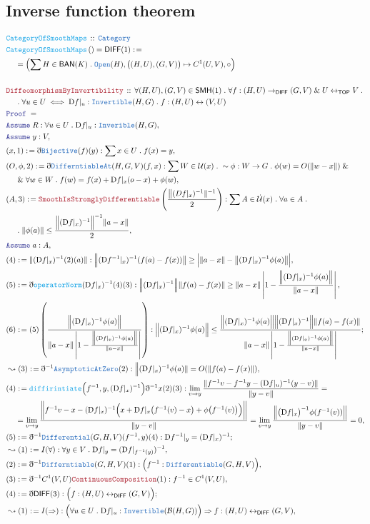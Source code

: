 \documentclass[12pt]{scrartcl}
\newcommand{\TYPE}[1]{\textcolor{NavyBlue}{\mathtt{#1}}}
\newcommand{\FUNC}[1]{\textcolor{Cerulean}{\mathtt{#1}}}
\newcommand{\LOGIC}[1]{\textcolor{Blue}{\mathtt{#1}}}
\newcommand{\THM}[1]{\textcolor{Maroon}{\mathtt{#1}}}
\renewcommand{\.}{\; . \;}
\newcommand{\de}{: \kern 0.1pc =}
\newcommand{\Act}[1]{\left( #1 \right)}
\newcommand{\Theorem}[2]{& \THM{#1} \, :: \, #2 \\ & \Proof = \\ }
\newcommand{\DeclareFunc}[2]{& \FUNC{#1} \, :: \, #2 \\}
\newcommand{\DefineNamedFunc}[4]{&  \FUNC{#1}\Act{#2} = #3 \de #4 \\}
\newcommand{\NewLine}{\\ & \kern 1pc}
\newcommand{\Page}[1]{\begin{align*} #1 \end{align*}   }
\newcommand{ \bd }{ \ByDef }
\renewcommand{\And}{\; \& \;}
\newcommand{\Cate}{\TYPE{Category}}
\newcommand{\ToBij}{\leftrightarrow}
\newcommand{\Say}[3]{& #1 \de #2 : #3, \\}
\newcommand{\Conclude}[3]{& #1 \de #2 : #3; \\}
\newcommand{\Derive}[3]{& \leadsto #1 \de #2 : #3, \\}
\newcommand{\A}{\LOGIC{Assume} \;}
\newcommand{\Assume}[2]{& \A #1 : #2, \\}
\newcommand{\ByDef}{\eth}
\newcommand{\Proof}{\LOGIC{Proof} \; }
\newcommand{\TOP}{\mathsf{TOP}}
\newcommand{\DIFF}{\mathsf{DIFF}}
\newcommand{\BAN}{\mathsf{BAN}} %
\newcommand{\D}{\mathrm{D}}
\newcommand{\B}{\mathcal{B}}
\begin{document}
\subsection{Inverse function theorem}
 \Page{
 	\DeclareFunc{CategoryOfSmoothMaps}{\Cate}
	\DefineNamedFunc{CategoryOfSmoothMaps}{}{\mathsf{DIFF}(1)}
	{
	\NewLine 
	  = \left( \sum H  \in \BAN(K) \. \TYPE{Open}(H) , \big( (H,U),(G,V) \big) \mapsto C^1(U,V) , \circ   \right)	
	}
	\\
\Theorem{DiffeomorphismByInvertibility}{\forall (H,U),(G,V) \in \mathsf{SMH}(1) \. \forall f : (H,U) \to_\DIFF (G,V) \And  U \ToBij_\TOP V \. \NewLine \.
  \forall u \in U  \iff \D f |_u : \TYPE{Invertible}(H,G) \. f : (H,U) \ToBij (V,U)
}
\Assume{R}{\forall u \in U \. \D f |_u : \TYPE{Inverible}(H,G)}
\Assume{y}{V}
\Say{(x,1)}{\bd \TYPE{Bijective}(f)(y)}{ \sum x \in U \. f(x) = y  }
\Say{(O,\phi,2)}{\bd \TYPE{DifferntiableAt}(H,G,V)(f,x)}{\sum W \in \mathcal{U}(x) \. \sim \phi : W \to G \.\phi(w) = O(\|w - x \|) 
 	\And 
	\NewLine \And
	\forall w \in W \. f(w) = f(x) + \D f |_x(o - x) + \phi(w) }
\Say{(A,3)}{ \THM{SmoothIsStronglyDifferentiable}\left(\frac{\big\|(D f|_x)^{-1}\|^{-1}}{2}\right)}
{\sum A \in \dot{\mathcal{U}}(x) \. \forall a \in A \. 
\NewLine \.
\|\phi(a)\|  \le \frac{\Big\|(\D f |_x )^{-1}\Big\|^{-1}\|a - x \|}{2}
}
\Assume{a}{A}
\Say{(4)}{ \|(\D f|_x)^{-1}(2)(a)\| }{  \Big \| (\D f^{-1} |_x)^{-1}(f(a) - f(x)) \big \| \ge \Big| \| a - x\|  - \big\| (\D f |_x)^{-1}\phi(a) \big\| \Big|   }
\Say{(5)}{ \bd \FUNC{operatorNorm}(\D f|_x)^{-1} (4)(3)}{\Big\| (\D f |_x)^{-1} \Big\| \| f(a) - f(x) \| \ge \|a - x\|\left|1 
	- \frac{\Big\|(\D f|_x)^{-1}\phi(a) \Big\|}{\|a - x\|} \right|  }
\Conclude{(6)}{ (5)\left(  \frac{\Big\| (\D f |_x)^{-1} \phi(a) \Big\|}{\|a - x\| 
\left| 1 - \frac{\Big\|(\D f |_x)^{-1} \phi(a)  \Big\|}{\|a - x\|}  \right|  }  \right)}
{  \Big\| (\D f |_x)^{-1}\phi(a) \Big\|   \le   \frac{\Big\| (\D f |_x)^{-1} \phi(a) \Big\|\Big\| (\D f |_x)^{-1}\Big\|\| f(a) - f(x)\| }{\|a - x\| 
\left| 1 - \frac{\Big\|(\D f |_x)^{-1} \phi(a)  \Big\|}{\|a - x\|} \right| }                          }
\Derive{(3)}{\bd^{-1} \TYPE{AsymptoticAtZero}(2)}{ \Big\| (\D f |_x)^{-1} \phi(a) \| = O(\|f(a) - f(x) \|)}
\Say{(4)}{ \FUNC{diffirintiate}\Big(f^{-1},y, (\D f |_x)^{-1} \Big)\bd^{-1} x (2)(3)   }
 { 
	\lim_{v \to y} \frac{\|f^{-1}{v} -  f^{-1}{y} - (\D f |_u )^{-1}(y - v) \| }{\|y - v\|} = \NewLine =  
	\lim_{v \to y} \frac{ \bigg\| f^{-1}{v}   - x  - (\D f |_x )^{-1}\Big( x + \D f |_x\big(f^{-1}(v) - x\big) + \phi\big(f^{-1}(v)\big)\Big) \bigg\| }{\| y - v \|}
	= 
	\lim_{v \to y} \frac{ \Big\| \big( \D f |_x \big)^{-1} \phi(f^{-1}(v))\Big\|  }{\| y - v \|} = 0
}
\Conclude{(5)}{\bd^{-1} \TYPE{Differential}(G,H,V)(f^{-1},y)(4)}{\D f^{-1}|_y = (\D f|_x)^{-1}}
\Derive{(1)}{I(\forall)}{\forall y \in V \. \D f|_y = (\D f|_{f^{-1}(y)})^{-1}}
\Say{(2)}{\bd^{-1} \TYPE{Differntiable}(G,H,V)(1)}{\Big( f^{-1} : \TYPE{Differentiable}(G,H,V)  \Big)}
\Say{(3)}{\bd^{-1}C^1(V,U)\THM{ContinuousComposition}(1)}{f^{-1} \in C^1(V,U)}
\Conclude{(4) }{\bd \DIFF(3)}{\Big( f : (H,U) \ToBij_\DIFF (G,V) \Big)}
\Derive{(1)}{I(\Rightarrow)}{\Big(\forall u \in U \. \D f |_u  : \TYPE{Invertible}(\B(H,G)) \Big) \Rightarrow f : (H,U) \ToBij_\DIFF (G,V) }
}
\end{document}
